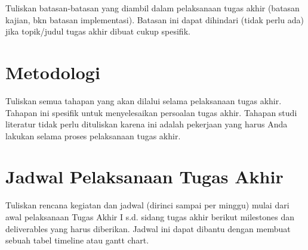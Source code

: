 Tuliskan batasan-batasan yang diambil dalam pelaksanaan tugas akhir (batasan
kajian, bkn batasan implementasi). Batasan ini dapat dihindari (tidak perlu ada)
jika topik/judul tugas akhir dibuat cukup spesifik.

\section{Metodologi}

Tuliskan semua tahapan yang akan dilalui selama pelaksanaan tugas akhir.
Tahapan ini spesifik untuk menyelesaikan persoalan tugas akhir. Tahapan studi
literatur tidak perlu dituliskan karena ini adalah pekerjaan yang harus Anda
lakukan selama proses pelaksanaan tugas akhir.

\section{Jadwal Pelaksanaan Tugas Akhir}

Tuliskan rencana kegiatan dan jadwal (dirinci sampai per minggu) mulai dari
awal pelaksanaan Tugas Akhir I s.d. sidang tugas akhir berikut milestones dan
deliverables yang harus diberikan. Jadwal ini dapat dibantu dengan membuat
sebuah tabel timeline atau gantt chart.
